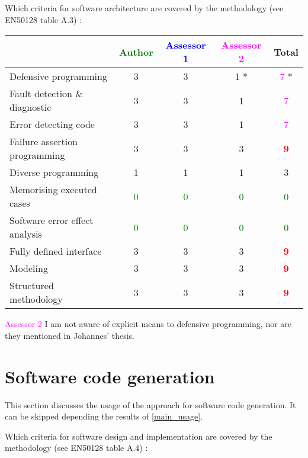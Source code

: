 Which criteria for software architecture are covered by the methodology
(see EN50128 table A.3) :

\begin{tabular}{|l | c | c | c | c|}
\hline
& \textcolor{green}{Author} & \textcolor{blue}{Assessor 1} & \textcolor{magenta}{Assessor 2} & Total \\
\hline
Defensive programming  &3 &3 & 1   *& \textcolor{magenta}{7} * \\
\hline 
Fault detection \& diagnostic  &3 &3 & 1   & \textcolor{magenta}{7} \\
\hline
Error detecting code  &3 &3 & 1   & \textcolor{magenta}{7} \\
\hline
Failure assertion programming &3 &3 & 3   & \textcolor{red}{\textbf{9}} \\
\hline
Diverse programming &1 &1 & 1   & 3    \\
\hline
Memorising executed cases & \textcolor{green}{0}   & \textcolor{green}{0}   & \textcolor{green}{0} & \textcolor{green}{0} \\
\hline
Software error effect analysis & \textcolor{green}{0}   & \textcolor{green}{0}   & \textcolor{green}{0} & \textcolor{green}{0} \\
\hline
Fully defined interface &3 &3 & 3   & \textcolor{red}{\textbf{9}} \\
\hline
Modeling  &3 &3 & 3   & \textcolor{red}{\textbf{9}} \\
\hline
Structured methodology &3 &3 & 3   & \textcolor{red}{\textbf{9}} \\
\hline
\end{tabular}

\textcolor{magenta}{Assessor 2} I am not aware of explicit means to defensive
programming, nor are they mentioned in Johannes' thesis.

\section{Software code generation}
This section discusses the usage of the approach for software code generation.
It can be skipped depending the results of \ref{main_usage}.

Which criteria for software design and implementation are covered by the methodology
(see EN50128 table A.4) :

